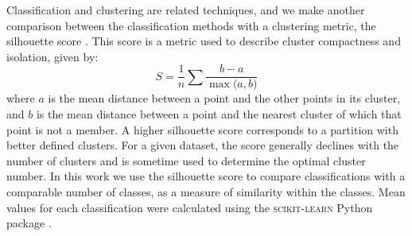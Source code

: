         Classification and clustering are related techniques, and we make
        another comparison between the classification methods with a clustering metric, the silhouette score  \citep{rousseeuw87}.        
This score is a metric used to describe cluster compactness and isolation, given by:
\begin{equation}
S = \frac{1}{n} \sum{\frac{b - a}{\max\big(a, b\big)}}
\end{equation}
where $a$ is the mean distance between a point and the other points in its cluster, and $b$ is the mean distance between a point and the nearest cluster of which that point is not a member.
A higher silhouette score corresponds to a partition with better defined clusters.
For a given dataset, the score generally declines with the number of clusters and is sometime used to determine the optimal cluster number.
In this work we use the silhouette score to compare classifications with a comparable number of classes, as a measure of similarity within the classes.
Mean values for each classification were calculated using the \textsc{scikit-learn} Python package \citep{sklearn}.

     
